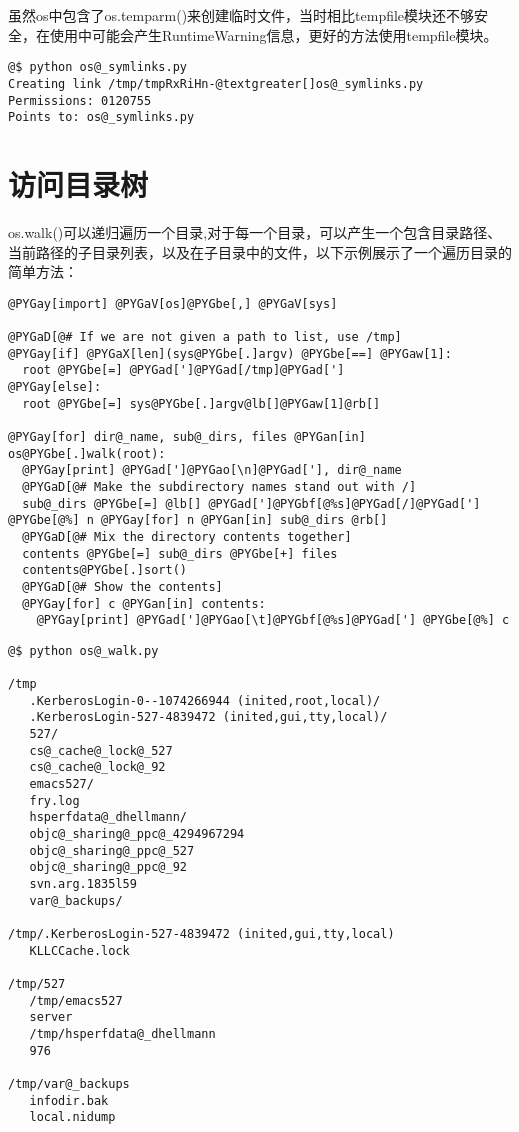 \documentclass[a4paper,10pt,english]{manual}
\begin{document}
虽然os中包含了os.temparm()来创建临时文件，当时相比tempfile模块还不够安全，在使用中可能会产生RuntimeWarning信息，更好的方法使用tempfile模块。

\begin{Verbatim}[commandchars=@\[\]]
@$ python os@_symlinks.py
Creating link /tmp/tmpRxRiHn-@textgreater[]os@_symlinks.py
Permissions: 0120755
Points to: os@_symlinks.py
\end{Verbatim}


\section{访问目录树}

os.walk()可以递归遍历一个目录,对于每一个目录，可以产生一个包含目录路径、当前路径的子目录列表，以及在子目录中的文件，以下示例展示了一个遍历目录的简单方法：

\begin{Verbatim}[commandchars=@\[\]]
@PYGay[import] @PYGaV[os]@PYGbe[,] @PYGaV[sys]

@PYGaD[@# If we are not given a path to list, use /tmp]
@PYGay[if] @PYGaX[len](sys@PYGbe[.]argv) @PYGbe[==] @PYGaw[1]:
  root @PYGbe[=] @PYGad[']@PYGad[/tmp]@PYGad[']
@PYGay[else]:
  root @PYGbe[=] sys@PYGbe[.]argv@lb[]@PYGaw[1]@rb[]

@PYGay[for] dir@_name, sub@_dirs, files @PYGan[in] os@PYGbe[.]walk(root):
  @PYGay[print] @PYGad[']@PYGao[\n]@PYGad['], dir@_name
  @PYGaD[@# Make the subdirectory names stand out with /]
  sub@_dirs @PYGbe[=] @lb[] @PYGad[']@PYGbf[@%s]@PYGad[/]@PYGad['] @PYGbe[@%] n @PYGay[for] n @PYGan[in] sub@_dirs @rb[]
  @PYGaD[@# Mix the directory contents together]
  contents @PYGbe[=] sub@_dirs @PYGbe[+] files
  contents@PYGbe[.]sort()
  @PYGaD[@# Show the contents]
  @PYGay[for] c @PYGan[in] contents:
    @PYGay[print] @PYGad[']@PYGao[\t]@PYGbf[@%s]@PYGad['] @PYGbe[@%] c
\end{Verbatim}

\begin{Verbatim}[commandchars=@\[\]]
@$ python os@_walk.py

/tmp
   .KerberosLogin-0--1074266944 (inited,root,local)/
   .KerberosLogin-527-4839472 (inited,gui,tty,local)/
   527/
   cs@_cache@_lock@_527
   cs@_cache@_lock@_92
   emacs527/
   fry.log
   hsperfdata@_dhellmann/
   objc@_sharing@_ppc@_4294967294
   objc@_sharing@_ppc@_527
   objc@_sharing@_ppc@_92
   svn.arg.1835l59
   var@_backups/

/tmp/.KerberosLogin-527-4839472 (inited,gui,tty,local)
   KLLCCache.lock

/tmp/527
   /tmp/emacs527
   server
   /tmp/hsperfdata@_dhellmann
   976

/tmp/var@_backups
   infodir.bak
   local.nidump
\end{Verbatim}
\end{document}
